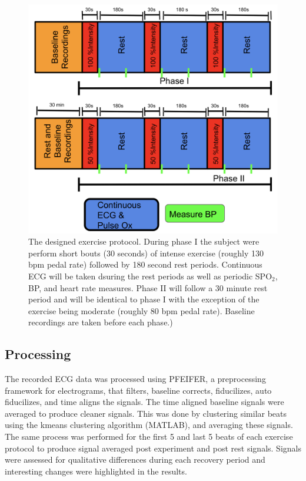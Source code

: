 \documentclass[12pt]{article}
\newcommand{\spo}{{SPO$_2$}}
\begin{document}
\begin{figure}[H]
	
	\centering
	\includegraphics[width = .8\textwidth]{Figures/protocol.png}
	\caption{The designed exercise protocol. During phase I the subject were perform short bouts (30 seconds) of intense exercise (roughly 130 bpm pedal rate) followed by  180 second rest periods. Continuous ECG will be taken dsuring the rest periods as well as periodic \spo{}, BP, and heart rate measures. Phase II  will follow a 30 minute rest period and will be identical to phase I with the exception of the exercise being moderate (roughly 80 bpm pedal rate). Baseline recordings are taken before each phase.)}
	\label{fig:Protocol}
\end{figure}

\subsection{Processing}
The recorded ECG data was processed using PFEIFER, a preprocessing framework for electrograms, that filters, baseline corrects, fiducilizes, auto fiducilizes, and time aligns the signals.\cite{MacLeod2018_p} The time aligned baseline signals were averaged to produce cleaner signals. This was done by clustering similar beats using the kmeans clustering algorithm (MATLAB), and averaging these signals. The same process was performed for the first 5 and last 5 beats of each exercise protocol to produce signal averaged post experiment and post rest signals. Signals were assessed for qualitative differences during each recovery period and interesting changes were highlighted in the results.
\end{document}
